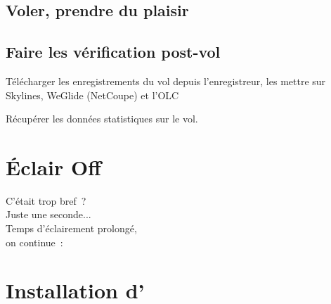 \documentclass[french, a4paper, 12pt]{refrep}
\begin{document}
\subsection*{\textcolor{flashblue}{Voler, prendre du plaisir}}

\subsection*{\textcolor{flashblue}{Faire les vérification post-vol}}
\begin{compactitem}
\item Télécharger les enregistrements du vol depuis l'enregistreur, les mettre sur Skylines, WeGlide (NetCoupe) et l'OLC
\item Récupérer les données statistiques sur le vol.
\end{compactitem}

\section*{{\color[rgb]{.9,.85,0}Éclair} Off}

\hspace*{1cm} C'était trop bref~?\\
\hspace*{4cm} Juste une seconde...\\
\hspace*{6cm} Temps d'éclairement prolongé,\\
\hspace*{10cm} on continue~:


\setlength{\parskip}{0.3\baselineskip}
\newpage
\section{Installation d'\xc}\label{ch:XCSinstall}

\end{document}
